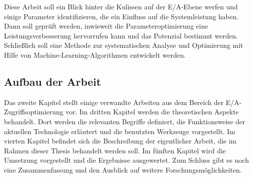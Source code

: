 Diese Arbeit soll ein Blick hinter die Kulissen auf der E/A-Ebene werfen und einige Parameter identifizieren, die ein Einfluss auf die Systemleistung haben. Dann soll geprüft werden, inwieweit die Parameteroptimierung eine Leistungsverbesserung hervorrufen kann und das Potenzial bestimmt werden. Schließlich soll eine Methode zur systematischen Analyse und Optimierung mit Hilfe von Machine-Learning-Algorithmen entwickelt werden. 


\subsection{Aufbau der Arbeit}
Das zweite Kapitel stellt einige verwandte Arbeiten aus dem Bereich der E/A-Zugriffsoptimierung vor. Im dritten Kapitel werden die theoretischen Aspekte behandelt. Dort werden die relevanten Begriffe definiert, die Funktionsweise der aktuellen Technologie erläutert und die benutzten Werkzeuge vorgestellt. 
Im vierten Kapitel befindet sich die Beschreibung der eigentlicher Arbeit, die im Rahmen dieser Thesis behandelt werden soll. 
Im fünften Kapitel wird die Umsetzung vorgestellt und die Ergebnisse ausgewertet. Zum Schluss gibt es noch eine Zusammenfassung und den Ausblick auf weitere Forschungsmöglichkeiten.
